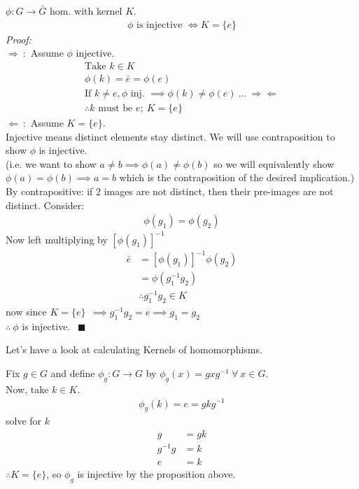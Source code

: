 \begin{proposition}
$\phi:G\rightarrow \bar{G}$ hom. with kernel $K$.
\begin{align}
    \phi \text{ is injective } \iff K= \{e\}\nonumber
\end{align}
\textit{Proof:}\\
$\Rightarrow \ :$ Assume $\phi$ injective.\\
\begin{align}
    \text{Take }k\in K \nonumber \\
    \phi(k)=\bar{e}=\phi(e) \nonumber \\
    \text{If }k\neq e , \phi \text{ inj. } \implies \phi(k)\neq \phi(e)\ ...\ \Rightarrow \Leftarrow \nonumber \\
    \therefore k \text{ must be }e; \ K=\{e\} \nonumber
\end{align}
$\Leftarrow \ :$ Assume $K=\{e\}$.\\
Injective means distinct elements stay distinct. We will use contraposition to show $\phi$ is injective. \steezybreak\\ %
(i.e. we want to show $a\neq b \implies \phi(a)\neq \phi(b)$ so we will equivalently show $\phi(a)=\phi(b) \implies a= b$ which is the contraposition of the desired implication.)\steezybreak\\
By contrapositive: if 2 images are not distinct, then their pre-images are not distinct. Consider:
\begin{align}
    \phi(g_1)=\phi(g_2)\nonumber
\end{align}
Now left multiplying by $[\phi(g_1)]^{-1}$
\begin{align}
    \bar{e}&=[\phi(g_1)]^{-1}\phi(g_2)\nonumber \\
    &= \phi(g_1^{-1}g_2) \nonumber \\
    &\therefore g_1^{-1}g_2\in K \nonumber
\end{align}
now since $K=\{e\}\ \ \implies g_1^{-1}g_2=e \implies g_1=g_2$\\
$\therefore \ \phi$ is injective. $\ \ \blacksquare$
\end{proposition}

Let's have a look at calculating Kernels of homomorphisms.
\begin{example}
Fix $g\in G$ and define $\phi_g: G\rightarrow G$ by $\phi_g(x)=gxg^{-1}\ \forall \  x \in G$. \\
Now, take $k\in K$.
\begin{align}
    \phi_g(k)=e=gkg^{-1} \nonumber
\end{align}
solve for $k$
\begin{align}
    g&=gk\nonumber \\
    g^{-1}g&=k\nonumber \\
    e&=k\nonumber 
\end{align}
$\therefore K = \{e\}$, so $\phi_g$ is injective by the proposition above.
\end{example}

